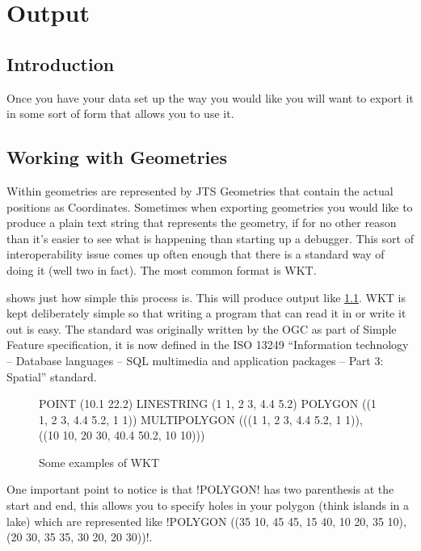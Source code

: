 \chapter{Output}

\section{Introduction}
Once you have your data set up the way you would like you will want 
to export it in some sort of form that allows you to use it.

\section{Working with Geometries}\label{geoms}
Within \GeoTools geometries are represented by \ac{JTS} Geometries that contain the actual positions as Coordinates.
Sometimes when exporting geometries you would like to produce a plain text string that represents the geometry, if for no other reason than it's easier to see what is happening than starting up a debugger. 
This sort of interoperability issue comes up often enough that there is a standard way of doing it (well two in fact). The most common format is \ac{WKT}.



 shows just how simple this process is. This will produce output like \cref{wktoutput}. WKT is kept deliberately simple so that writing a program that can read it in or write it out is easy. The standard was originally written by the \ac{OGC} as part of Simple Feature specification, it is now defined in the ISO 13249 ``Information technology -- Database languages -- SQL multimedia and application packages -- Part 3: Spatial'' standard.

\begin{figure}[h]
\begin{spverbatim}
POINT (10.1 22.2) 
LINESTRING (1 1, 2 3, 4.4 5.2)
POLYGON ((1 1, 2 3, 4.4 5.2, 1 1))
MULTIPOLYGON (((1 1, 2 3, 4.4 5.2, 1 1)), 
    ((10 10, 20 30, 40.4 50.2, 10 10)))
\end{spverbatim}
\caption{Some examples of WKT}\label{wktoutput}
\end{figure}

One important point to notice is that \spverb!POLYGON! has two parenthesis at the start and end, this allows you to specify holes in your polygon (think islands in a lake) which are represented like \spverb!POLYGON ((35 10, 45 45, 15 40, 10 20, 35 10),(20 30, 35 35, 30 20, 20 30))!. 

